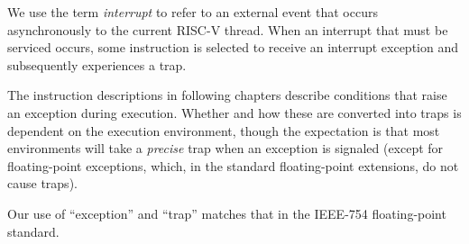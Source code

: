 We use the term {\em interrupt} to refer to an external event that
occurs asynchronously to the current RISC-V thread. When an interrupt
that must be serviced occurs, some instruction is selected to receive
an interrupt exception and subsequently experiences a trap.

The instruction descriptions in following chapters describe conditions
that raise an exception during execution.  Whether and how these are
converted into traps is dependent on the execution environment, though
the expectation is that most environments will take a {\em precise}
trap when an exception is signaled (except for floating-point
exceptions, which, in the standard floating-point extensions, do not
cause traps).

\begin{commentary}
Our use of ``exception'' and ``trap'' matches that in the IEEE-754
floating-point standard.
\end{commentary}

